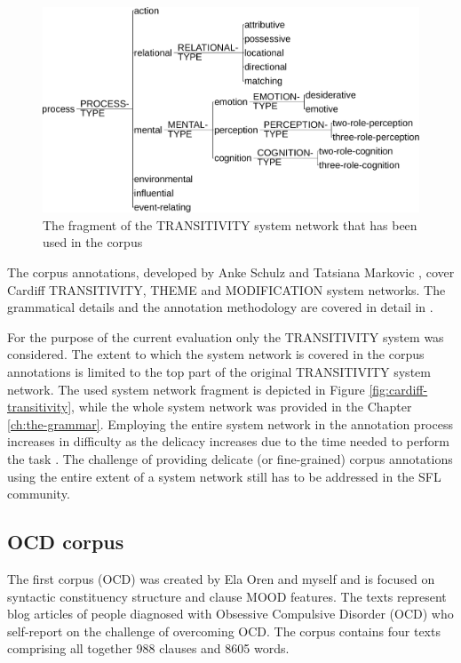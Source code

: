     \begin{figure}[!h]
        \centering
        \includegraphics[width=.75\textwidth]{Figures/Evaluation/trans-simplified.pdf}
        \caption{The fragment of the TRANSITIVITY system network that has been used in the corpus}
        \label{fig:transitivity-simplified}
    \end{figure}

    The corpus annotations, developed by Anke Schulz and Tatsiana Markovic \citep[36]{schulz2015me}, cover Cardiff TRANSITIVITY, THEME and MODIFICATION system networks. The grammatical details and the annotation methodology are covered in detail in \citet[48-161]{schulz2015me}.
    
    For the purpose of the current evaluation only the TRANSITIVITY system was considered. The extent to which the system network is covered in the corpus annotations is limited to the top part of the original TRANSITIVITY system network. The used system network fragment is depicted in Figure \ref{fig:cardiff-transitivity}, while the whole system network was provided in the Chapter \ref{ch:the-grammar}. Employing the entire system network in the annotation process increases in difficulty as the delicacy increases due to the time needed to perform the task \citep[33]{mcenery2006corpus}. The challenge of providing delicate (or fine-grained) corpus annotations using the entire extent of a system network still has to be addressed in the SFL community. 
    

\subsection{OCD corpus}

     The first corpus (OCD) was created by Ela Oren and myself and is focused on syntactic constituency structure and clause MOOD features. The texts represent blog articles of people diagnosed with Obsessive Compulsive Disorder (OCD) who self-report on the challenge of overcoming OCD. The corpus contains four texts comprising all together 988 clauses and 8605 words. 

